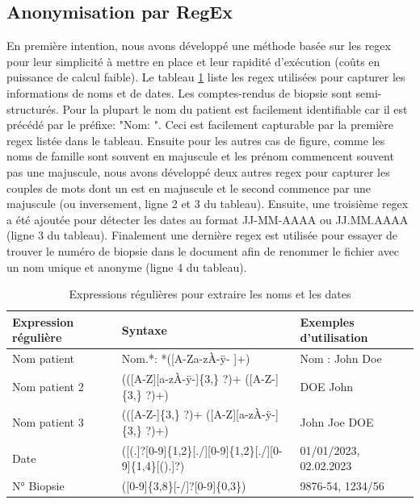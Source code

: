 \subsection{Anonymisation par RegEx}
En première intention, nous avons développé une méthode basée sur les \gls{regex} pour leur simplicité à mettre en place et leur rapidité d'exécution (coûts en puissance de calcul faible). Le tableau \ref{tab:regex} liste les \gls{regex} utilisées pour capturer les informations de noms et de dates. Les comptes-rendus de biopsie sont semi-structurés. Pour la plupart le nom du patient est facilement identifiable car il est précédé par le préfixe: "Nom: ". Ceci est facilement capturable par la première \gls{regex} listée dans le tableau. Ensuite pour les autres cas de figure, comme les noms de famille sont souvent en majuscule et les prénom commencent souvent pas une majuscule, nous avons développé deux autres \gls{regex} pour capturer les couples de mots dont un est en majuscule et le second commence par une majuscule (ou inversement, ligne 2 et 3 du tableau). 
Ensuite, une troisième \gls{regex} a été ajoutée pour détecter les dates au format JJ-MM-AAAA ou JJ.MM.AAAA (ligne 3 du tableau). Finalement une dernière \gls{regex} est utilisée pour essayer de trouver le numéro de biopsie dans le document afin de renommer le fichier avec un nom unique et anonyme (ligne 4 du tableau). 
\begin{table}[ht]
\centering
\caption{Expressions régulières pour extraire les noms et les dates}
\label{tab:regex}
\begin{tabular}{|l|l|l|}
\hline
\textbf{Expression régulière} & \textbf{Syntaxe} & \textbf{Exemples d'utilisation} \\ \hline
Nom patient & Nom.*: *([A-Za-zÀ-ÿ- ]+) & Nom : John Doe \\ \hline
Nom patient 2& (([A-Z][a-zÀ-ÿ-]\{3,\} ?)+ ([A-Z-]\{3,\} ?)+) & DOE John \\ \hline
Nom patient 3 & (([A-Z-]\{3,\} ?)+ ([A-Z][a-zÀ-ÿ-]\{3,\} ?)+) & John Joe DOE \\ \hline
Date & ([(.]?[0-9]\{1,2\}[./][0-9]\{1,2\}[./][0-9]\{1,4\}[().]?) & 01/01/2023, 02.02.2023 \\ \hline
N° Biopsie & ([0-9]\{3,8\}[-/]?[0-9]\{0,3\}) & 9876-54, 1234/56 \\ \hline
\end{tabular}
\end{table}
